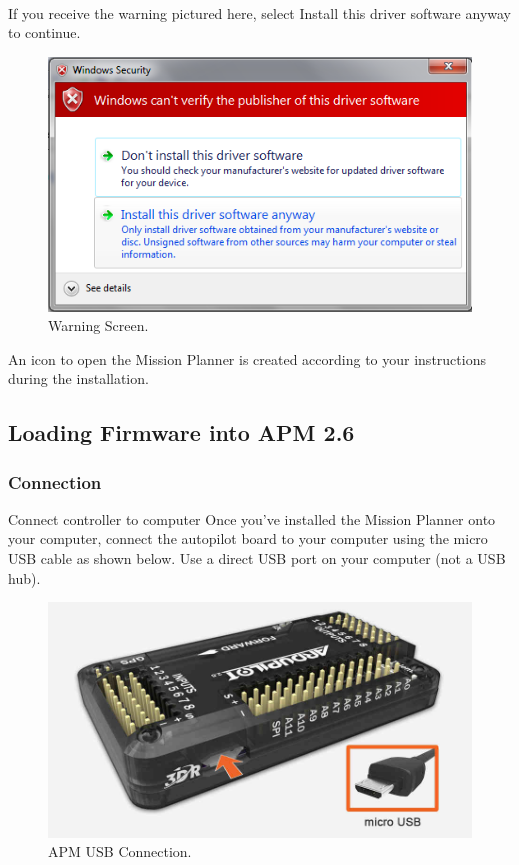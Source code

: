 \documentclass[11pt,a4paper]{article}
\begin{document}
	 \paragraph{}If you receive the warning pictured here, select Install this driver software anyway to continue.
	 \begin{figure}[H]
	 	\centering
		\includegraphics[scale=0.75]{driver}
	 	\caption{Warning Screen.}
\end{figure}

An icon to open the Mission Planner is created according to your instructions during the installation.

	\subsection{Loading Firmware into APM 2.6}
		\subsubsection{Connection}Connect controller to computer
Once you’ve installed the Mission Planner onto your computer, connect the autopilot board to your computer using the micro USB cable as shown below. Use a direct USB port on your computer (not a USB hub).
		\begin{figure}[H]
	 	\centering
		\includegraphics[scale=0.20]{usb}
	 	\caption{APM USB Connection.}
		\end{figure}
		
\end{document}
